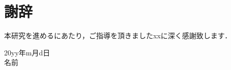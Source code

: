 ﻿\newcommand{\fulltoday}{\number\day\space \ifcase\month\or
    January\or February\or March\or April\or May\or June\or
    July\or August\or September\or October\or November\or December\fi
  \space\number\year}

\chapter*{謝辞}
  本研究を進めるにあたり，ご指導を頂きましたxxに深く感謝致します．
  
  \begin{flushright}
    20yy年m月d日\\
    名前
  \end{flushright}
